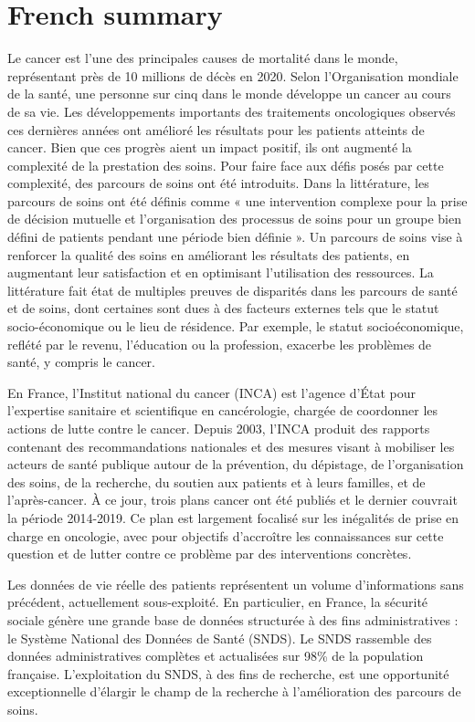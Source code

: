 \chapter*{French summary}

Le cancer est l'une des principales causes de mortalité dans le monde,
représentant près de 10 millions de décès en 2020. Selon l'Organisation mondiale
de la santé, une personne sur cinq dans le monde développe un cancer au cours de
sa vie. Les développements importants des traitements oncologiques observés ces
dernières années ont amélioré les résultats pour les patients atteints de
cancer. Bien que ces progrès aient un impact positif, ils ont augmenté la
complexité de la prestation des soins. Pour faire face aux défis posés par cette
complexité, des parcours de soins ont été introduits. Dans la littérature, les
parcours de soins ont été définis comme « une intervention complexe pour la
prise de décision mutuelle et l'organisation des processus de soins pour un
groupe bien défini de patients pendant une période bien définie ». Un parcours
de soins vise à renforcer la qualité des soins en améliorant les résultats des
patients, en augmentant leur satisfaction et en optimisant l'utilisation des
ressources. La littérature fait état de multiples preuves de disparités dans les
parcours de santé et de soins, dont certaines sont dues à des facteurs externes
tels que le statut socio-économique ou le lieu de résidence. Par exemple, le
statut socioéconomique, reflété par le revenu, l'éducation ou la profession,
exacerbe les problèmes de santé, y compris le cancer.

En France, l'Institut
national du cancer (INCA) est l'agence d'État pour l'expertise sanitaire et
scientifique en cancérologie, chargée de coordonner les actions de lutte contre
le cancer. Depuis 2003, l'INCA produit des rapports contenant des
recommandations nationales et des mesures visant à mobiliser les acteurs de
santé publique autour de la prévention, du dépistage, de l'organisation des
soins, de la recherche, du soutien aux patients et à leurs familles, et de
l'après-cancer. À ce jour, trois plans cancer ont été publiés et le dernier
couvrait la période 2014-2019. Ce plan est largement focalisé sur les inégalités
de prise en charge en oncologie, avec pour objectifs d'accroître les
connaissances sur cette question et de lutter contre ce problème par des
interventions concrètes.

Les données de vie réelle des patients représentent un
volume d'informations sans précédent, actuellement sous-exploité. En
particulier, en France, la sécurité sociale génère une grande base de données
structurée à des fins administratives : le Système National des Données de Santé
(SNDS). Le SNDS rassemble des données administratives complètes et actualisées
sur 98\% de la population française. L'exploitation du SNDS, à des fins de
recherche, est une opportunité exceptionnelle d'élargir le champ de la recherche
à l'amélioration des parcours de soins.

